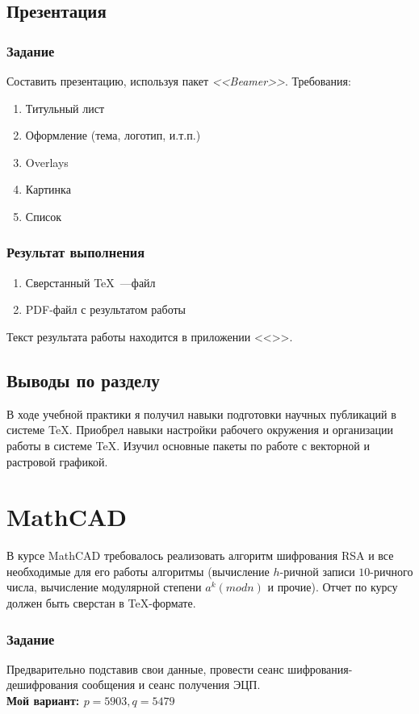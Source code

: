 \documentclass[a4paper,12pt]{article}
\begin{document}
\newpage
\subsection{Презентация}
\subsubsection{Задание}
Составить презентацию, используя пакет \textit{<<Beamer>>}.
Требования:
\begin{enumerate}
	\item Титульный лист
	\item Оформление (тема, логотип, и.т.п.)
	\item Overlays
	\item Картинка
	\item Список
\end{enumerate}
\subsubsection{Результат выполнения}
\begin{enumerate}
	\item Сверстанный {\TeX}~---файл 
	\item PDF-файл с результатом работы
\end{enumerate}
Текст результата работы находится в приложении <<>>.\\

\subsection{Выводы по разделу}
В ходе учебной практики я получил навыки подготовки научных публикаций в системе \TeX . Приобрел навыки настройки рабочего окружения и организации работы в системе \TeX . Изучил основные пакеты по работе с векторной и растровой графикой.
\newpage
\section{MathCAD}
\label{sec:mathcad}
В курсе MathCAD требовалось реализовать алгоритм шифрования RSA и все необходимые для его работы алгоритмы (вычисление $h$-ричной записи $10$-ричного числа, вычисление модулярной степени $a^k (mod n)$ и прочие). Отчет по курсу должен быть сверстан в \TeX -формате. 
\subsubsection{Задание}
Предварительно подставив свои данные, провести сеанс шифрования-дешифрования сообщения и сеанс получения ЭЦП. \medskip\\ 
\textbf{Мой вариант: $p = 5903, q = 5479$}
\end{document}
